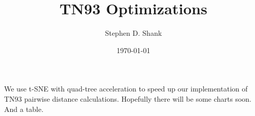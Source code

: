\documentclass[12pt]{article}
\begin{document}
\title{TN93 Optimizations}
\author{Stephen D. Shank}
\date{\today}
\maketitle

We use t-SNE \cite{maaten2008visualizing} with quad-tree acceleration \cite{van2014accelerating} to speed up our implementation of TN93 pairwise distance calculations. Hopefully there will be some charts soon. And a table.



\end{document}
